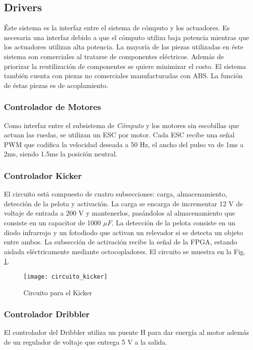 \subsection{Drivers}
Éste sistema es la interfaz entre el sistema de cómputo y los actuadores. Es necesaria una interfaz debido a que el cómputo utiliza baja potencia mientras que los actuadores utilizan alta potencia. La mayoría de las piezas utilizadas en éste sistema son comerciales al tratarse de componentes eléctricos. Además de priorizar la reutilización de componentes se quiere minimizar el costo. El sistema también cuenta con piezas no comerciales manufacturadas con \gls{ABS}. La función de éstas piezas es de acoplamiento.

\subsubsection{Controlador de Motores}
Como interfaz entre el subsistema de \textit{Cómputo} y los motores sin escobillas que actuan las ruedas, se utilizan un \gls{ESC} \cite{esc_afro} por motor. Cada \gls{ESC} recibe una señal \gls{PWM} que codifica la velocidad deseada a 50 Hz, el ancho del pulso va de 1ms a 2ms, siendo 1.5ms la posición neutral. 

\subsubsection{Controlador Kicker}
El circuito está compuesto de cuatro subsecciones: carga, almacenamiento, detección de la pelota y activación. La carga se encarga de incrementar 12 V de voltaje de entrada a 200 V y mantenerlos, pasándolos al almacenamiento que consiste en un capacitor de 1000 $\mu F$. La detección de la pelota consiste en un diodo infrarrojo y un fotodiodo que activan un relevador si se detecta un objeto entre ambos. La subsección de activación recibe la señal de la \gls{FPGA}, estando aislada eléctricamente mediante octocopladores. El circuito se muestra en la Fig. \ref{fig:circuito_kicker}.

\begin{figure}
	\centering
		\texttt{[image: circuito\_kicker]}
	\caption{Circuito para el Kicker}
	\label{fig:circuito_kicker}
\end{figure}



\subsubsection{Controlador Dribbler}
El controlador del \gls{Dribbler} utiliza un puente H \cite{instruments2005l293} para dar energía al motor además de un regulador de voltaje que entrega 5 V a la salida. 


